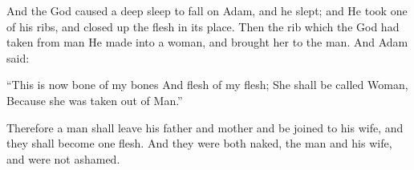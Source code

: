 \bverse And the \lord God caused a deep sleep to fall on Adam, and he slept; and He took one of his ribs, and closed up the flesh in its place.
\bverse Then the rib which the \lord God had taken from man He made into a woman, and brought her to the man.
\bverse And Adam said: 
\begin{bquotation}
``This is now bone of my bones And flesh of my flesh; She shall be called Woman, Because she was taken out of Man.''
\end{bquotation}
\bverse Therefore a man shall leave his father and mother and be joined to his wife, and they shall become one flesh.
\bverse And they were both naked, the man and his wife, and were not ashamed.









